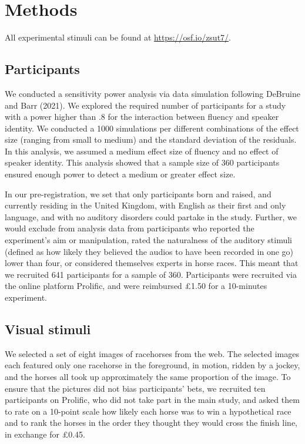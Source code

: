 \documentclass[
  man,floatsintext]{apa7}
\begin{document}
\hypertarget{methods}{%
\section{Methods}\label{methods}}

All experimental stimuli can be found at \url{https://osf.io/zsut7/}.

\hypertarget{participants}{%
\subsection{Participants}\label{participants}}

We conducted a sensitivity power analysis via data simulation following DeBruine and Barr (2021). We explored the required number of participants for a study with a power higher than .8 for the interaction between fluency and speaker identity. We conducted a 1000 simulations per different combinations of the effect size (ranging from small to medium) and the standard deviation of the residuals. In this analysis, we assumed a medium effect size of fluency and no effect of speaker identity. This analysis showed that a sample size of 360 participants ensured enough power to detect a medium or greater effect size.

In our pre-registration, we set that only participants born and raised, and currently residing in the United Kingdom, with English as their first and only language, and with no auditory disorders could partake in the study. Further, we would exclude from analysis data from participants who reported the experiment's aim or manipulation, rated the naturalness of the auditory stimuli (defined as how likely they believed the audios to have been recorded in one go) lower than four, or considered themselves experts in horse races. This meant that we recruited 641 participants for a sample of 360. Participants were recruited via the online platform Prolific, and were reimbursed £1.50 for a 10-minutes experiment.

\hypertarget{visual-stimuli}{%
\subsection{Visual stimuli}\label{visual-stimuli}}

We selected a set of eight images of racehorses from the web. The selected images each featured only one racehorse in the foreground, in motion, ridden by a jockey, and the horses all took up approximately the same proportion of the image. To ensure that the pictures did not bias participants' bets, we recruited ten participants on Prolific, who did not take part in the main study, and asked them to rate on a 10-point scale how likely each horse was to win a hypothetical race and to rank the horses in the order they thought they would cross the finish line, in exchange for £0.45.
\end{document}
